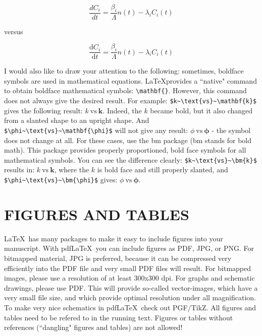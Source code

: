 \documentclass[12pt]{article}
\begin{document}
\begin{equation*}
  \frac{dC_i}{dt} = \frac{\beta_i}{\Lambda} n(t) - \lambda_i C_i(t)
\end{equation*}

versus

\begin{equation*}
  \frac{\mathrm{d}C_i}{\mathrm{d}t} = \frac{\beta_i}{\Lambda} n(t) - \lambda_i C_i(t)
\end{equation*}

I would also like to draw your attention to the following: sometimes, boldface symbols are used in mathematical equations. \LaTeX provides a ``native" command to obtain boldface mathematical symbols: \verb|\mathbf{}|. However, this command does not always give the desired result. For example: \verb|$k~\text{vs}~\mathbf{k}$| gives the following result: $k~\text{vs}~\mathbf{k}$. Indeed, the $k$ became bold, but it also changed from a slanted shape to an upright shape. And \verb|$\phi~\text{vs}~\mathbf{\phi}$| will not give any result: $\phi~\text{vs}~\mathbf{\phi}$ - the symbol does not change at all. For these cases, use the bm package (bm stands for bold math). This package provides properly proportioned, bold face symbols for all mathematical symbols. You can see the difference clearly: \verb|$k~\text{vs}~\bm{k}$| results in: $k~\text{vs}~\bm{k}$, where the $k$ is bold face and still properly slanted, and \verb|$\phi~\text{vs}~\bm{\phi}$| gives: $\phi~\text{vs}~\bm{\phi}$.

%
\section{FIGURES AND TABLES} 
\label{sect::floats}

\LaTeX\ has many packages to make it easy to include figures into your manuscript. With pdf\LaTeX\, you can include figures as PDF, JPG, or PNG. For bitmapped material, JPG is preferred, because it can be compressed very efficiently into the PDF file and very small PDF files will result. For bitmapped images, please use a resolution of at least 300x300 dpi. For graphs and schematic drawings, please use PDF. This will provide so-called vector-images, which have a very small file size, and which provide optimal resolution under all magnification. To make very nice schematics in pdf\LaTeX\, check out PGF/TikZ. All figures and tables need to be refered to in the running text. Figures or tables without references (``dangling" figures and tables) are not allowed!
\end{document}
